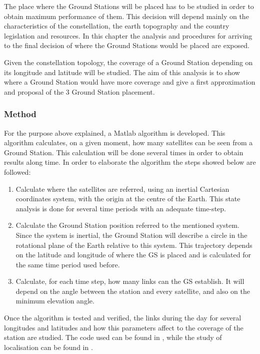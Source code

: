 The place where the Ground Stations will be placed has to be studied in order to obtain maximum performance of them. This decision will depend mainly on the characteristics of the constellation, the earth topography and the country legislation and resources. In this chapter the analysis and procedures for arriving to the final decision of where the Ground Stations would be placed are exposed.

Given the constellation topology, the coverage of a Ground Station depending on its longitude and latitude will be studied. The aim of this analysis is to show where a Ground Station would have more coverage and give a first approximation and proposal of the 3 Ground Station placement.

\subsubsection{Method}
For the purpose above explained, a Matlab algorithm is developed. This algorithm calculates, on a given moment, how many satellites can be seen from a Ground Station. This calculation will be done several times in order to obtain results along time. In order to elaborate the algorithm the steps showed below are followed:
\begin{enumerate}
\item Calculate where the satellites are referred, using an inertial Cartesian coordinates system, with the origin at the centre of the Earth. This state analysis is done for several time periods with an adequate time-step. 
\item Calculate the Ground Station position referred to the mentioned system. Since the system is inertial, the Ground Station will describe a circle in the rotational plane of the Earth relative to this system. This trajectory depends on the latitude and longitude of where the GS is placed and is calculated for the same time period used before.
\item Calculate, for each time step, how many links can the GS establish. It will depend on the angle between the station and every satellite, and also on the minimum elevation angle. 
\end{enumerate}

Once the algorithm is tested and verified, the links during the day for several longitudes and latitudes and how this parameters affect to the coverage of the station are studied. The code used can be found in \cite[Chapter 1, Section 12]{annex6}, while the study of localisation can be found in \cite[Chapter 3, Section 1]{annex3}.

